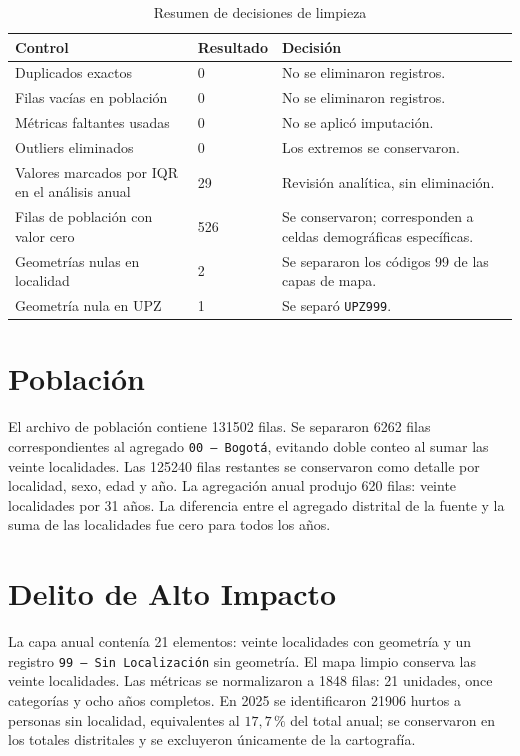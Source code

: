 \documentclass[11pt,letterpaper,oneside]{report}
\begin{document}
\begin{table}[H]
\centering
\caption{Resumen de decisiones de limpieza}\label{tab:cleaning}
\begin{tabularx}{\textwidth}{Y C{0.18\textwidth} Y}
\toprule
\textbf{Control} & \textbf{Resultado} & \textbf{Decisión} \\
\midrule
Duplicados exactos & 0 & No se eliminaron registros. \\
Filas vacías en población & 0 & No se eliminaron registros. \\
Métricas faltantes usadas & 0 & No se aplicó imputación. \\
Outliers eliminados & 0 & Los extremos se conservaron. \\
Valores marcados por IQR en el análisis anual & 29 & Revisión analítica, sin eliminación. \\
Filas de población con valor cero & 526 & Se conservaron; corresponden a celdas demográficas específicas. \\
Geometrías nulas en localidad & 2 & Se separaron los códigos 99 de las capas de mapa. \\
Geometría nula en UPZ & 1 & Se separó \texttt{UPZ999}. \\
\bottomrule
\end{tabularx}
\end{table}

\section{Población}

El archivo de población contiene \num{131502} filas. Se separaron \num{6262} filas correspondientes al agregado \texttt{00 -- Bogotá}, evitando doble conteo al sumar las veinte localidades. Las \num{125240} filas restantes se conservaron como detalle por localidad, sexo, edad y año. La agregación anual produjo 620 filas: veinte localidades por 31 años. La diferencia entre el agregado distrital de la fuente y la suma de las localidades fue cero para todos los años.

\section{Delito de Alto Impacto}

La capa anual contenía 21 elementos: veinte localidades con geometría y un registro \texttt{99 -- Sin Localización} sin geometría. El mapa limpio conserva las veinte localidades. Las métricas se normalizaron a \num{1848} filas: 21 unidades, once categorías y ocho años completos. En 2025 se identificaron \num{21906} hurtos a personas sin localidad, equivalentes al \(17{,}7\,\%\) del total anual; se conservaron en los totales distritales y se excluyeron únicamente de la cartografía.
\end{document}

